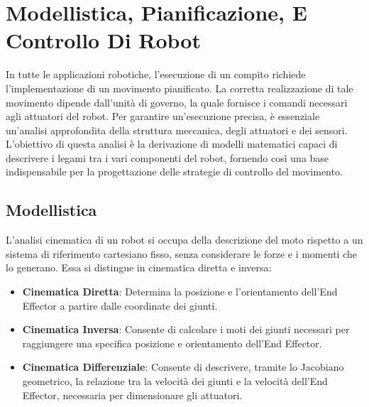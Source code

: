 \documentclass[11pt, a4paper]{report}
\begin{document}
\section{Modellistica, Pianificazione, E Controllo Di Robot}
In tutte le applicazioni robotiche, l'esecuzione di un compito richiede l'implementazione di un movimento pianificato. La corretta realizzazione di tale movimento dipende dall'unità di governo, la quale fornisce i comandi necessari agli attuatori del robot. Per garantire un'esecuzione precisa, è essenziale un'analisi approfondita della struttura meccanica, degli attuatori e dei sensori.
L'obiettivo di questa analisi è la derivazione di modelli matematici capaci di descrivere i legami tra i vari componenti del robot, fornendo così una base indispensabile per la progettazione delle strategie di controllo del movimento.

\subsection{Modellistica}
L'analisi cinematica di un robot si occupa della descrizione del moto rispetto a un sistema di riferimento cartesiano fisso, senza considerare le forze e i momenti che lo generano.
Essa si distingue in cinematica diretta e inversa:
\begin{itemize}
    \item \textbf{Cinematica Diretta}: Determina la posizione e l'orientamento dell'End Effector a partire dalle coordinate dei giunti.
    \item \textbf{Cinematica Inversa}: Consente di calcolare i moti dei giunti necessari per raggiungere una specifica posizione e orientamento dell'End Effector.
    \item \textbf{Cinematica Differenziale}: Consente di descrivere, tramite lo Jacobiano geometrico, la relazione tra la velocità dei giunti e la velocità dell'End Effector, necessaria per dimensionare gli attuatori.
\end{itemize}

\end{document}
